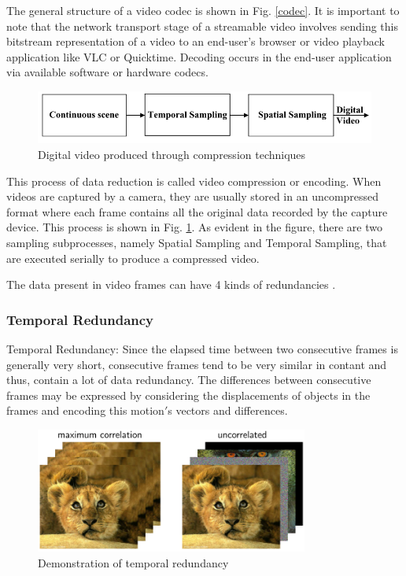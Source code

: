 \documentclass[letterpaper,12pt,titlepage,oneside,final]{report}
\begin{document}
            The general structure of a video codec is shown in Fig. \ref{codec}. It is important to note that the network transport stage of a streamable video involves sending this bitstream representation of a video to an end-user's browser or video playback application like VLC or Quicktime. Decoding occurs in the end-user application via available software or hardware codecs.
            \begin{figure}[!h]
                \centering
                \includegraphics[width=\textwidth]{videnc}
                \caption{Digital video produced through compression techniques}
                \label{videnc}
            \end{figure}

            This process of data reduction is called video compression or encoding. When videos are captured by a camera, they are usually stored in an uncompressed format where each frame contains all the original data recorded by the capture device. This process is shown in Fig. \ref{videnc}. As evident in the figure, there are two sampling subprocesses, namely Spatial Sampling and Temporal Sampling, that are executed serially to produce a compressed video. 

            The data present in video frames can have 4 kinds of redundancies \cite{Saggi2010}.
            \subsubsection{Temporal Redundancy} %
            \label{sub:temporal_redundancy}
                Temporal Redundancy: Since the elapsed time between two consecutive frames is generally very short, consecutive frames tend to be very similar in contant and thus, contain a lot of data redundancy. The differences between consecutive frames may be expressed by considering the displacements of objects in the frames and encoding this motion$'$s vectors and differences. 
                \begin{figure}[!h]
                    \centering
                    \includegraphics[width=0.8\textwidth]{tempredun}
                    \caption{Demonstration of temporal redundancy\cite{Kundur}}
                    \label{tempredun}
                \end{figure}
\end{document}
